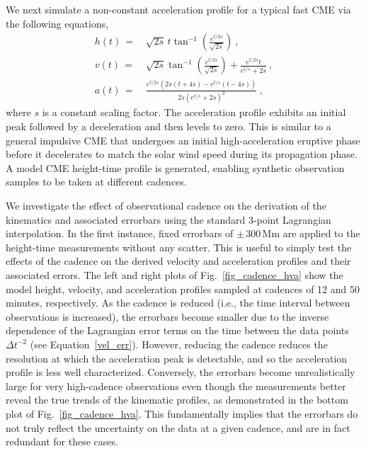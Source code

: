 \documentclass[structabstract]{aa}
\begin{document}
We next simulate a non-constant acceleration profile for a typical fast CME via the following equations,
\begin{eqnarray}
h(t)\,=&\,\sqrt{2s}\,t\tan^{-1}\left(\frac{e^{t/2s}}{\sqrt{2s}}\right) \ , \\
v(t)\,=&\,\sqrt{2s}\tan^{-1}\left(\frac{e^{t/2s}}{\sqrt{2s}}\right)+\frac{e^{t/2s}t}{e^{t/s}+2s} \ , \\
a(t)\,=&\,\frac{e^{t/2s}\left(2s\left(t+4s\right)-e^{t/s}\left(t-4s\right)\right)}{2s\left(e^{t/s}+2s\right)^2}\ ,
\label{eqn:nonconst_a}
\end{eqnarray}
where $s$ is a constant scaling factor. The acceleration profile exhibits an initial peak followed by a deceleration and then levels to zero. This is similar to a general impulsive CME that undergoes an initial high-acceleration eruptive phase before it decelerates to match the solar wind speed during its propagation phase. A model CME height-time profile is generated, enabling synthetic observation samples to be taken at different cadences. 


We investigate the effect of observational cadence on the derivation of the kinematics and associated errorbars using the standard 3-point Lagrangian interpolation. In the first instance, fixed errorbars of $\pm\,300$\,Mm are applied to the height-time measurements without any scatter. This is useful to simply test the effects of the cadence on the derived velocity and acceleration profiles and their associated errors. The left and right plots of Fig.~\ref{fig_cadence_hva} show the model height, velocity, and acceleration profiles sampled at cadences of 12 and 50\,minutes, respectively. As the cadence is reduced (i.e., the time interval between observations is increased), the errorbars become smaller due to the inverse dependence of the Lagrangian error terms on the time between the data points $\Delta t^{-2}$ (see Equation~\ref{vel_err}). However, reducing the cadence reduces the resolution at which the acceleration peak is detectable, and so the acceleration profile is less well characterized. Conversely, the errorbars become unrealistically large for very high-cadence observations even though the measurements better reveal the true trends of the kinematic profiles, as demonstrated in the bottom plot of Fig.~\ref{fig_cadence_hva}. This fundamentally implies that the errorbars do not truly reflect the uncertainty on the data at a given cadence, and are in fact redundant for these cases.
\end{document}
